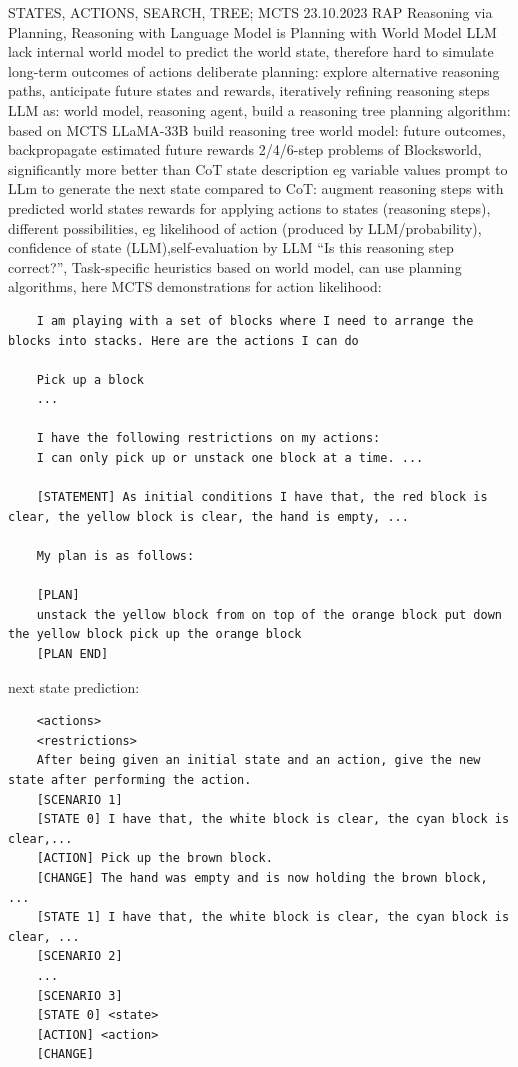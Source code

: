 \documentclass{article}
\begin{document}
STATES, ACTIONS, SEARCH, TREE; MCTS
\cite{hao_reasoning_2023} 23.10.2023 RAP Reasoning via Planning, Reasoning with Language Model is Planning with World Model
LLM lack internal world model to predict the world state, therefore hard to simulate long-term outcomes of actions
deliberate planning: explore alternative reasoning paths, anticipate future states and rewards, iteratively refining reasoning steps
LLM as: world model, reasoning agent, build a reasoning tree
planning algorithm: based on MCTS
LLaMA-33B
build reasoning tree
world model: future outcomes, 
backpropagate estimated future rewards
2/4/6-step problems of Blocksworld, significantly more better than CoT
state description eg variable values
prompt to LLm to generate the next state
compared to CoT: augment reasoning steps with predicted world states
rewards for applying actions to states (reasoning steps), different possibilities, eg likelihood of action (produced by LLM/probability), confidence of state (LLM),self-evaluation by LLM “Is this reasoning step correct?”, Task-specific heuristics
based on world model, can use planning algorithms, here MCTS
demonstrations for action likelihood:
\begin{verbatim}
	I am playing with a set of blocks where I need to arrange the blocks into stacks. Here are the actions I can do 
	
	Pick up a block 
	...
	
	I have the following restrictions on my actions: 
	I can only pick up or unstack one block at a time. ...
	
	[STATEMENT] As initial conditions I have that, the red block is clear, the yellow block is clear, the hand is empty, ...
	
	My plan is as follows: 
	
	[PLAN] 
	unstack the yellow block from on top of the orange block put down the yellow block pick up the orange block
	[PLAN END]
\end{verbatim}
next state prediction: 
\begin{verbatim}
	<actions>
	<restrictions>
	After being given an initial state and an action, give the new state after performing the action. 
	[SCENARIO 1] 
	[STATE 0] I have that, the white block is clear, the cyan block is clear,... 
	[ACTION] Pick up the brown block. 
	[CHANGE] The hand was empty and is now holding the brown block, ... 
	[STATE 1] I have that, the white block is clear, the cyan block is clear, ...
	[SCENARIO 2]
	...
	[SCENARIO 3] 
	[STATE 0] <state> 
	[ACTION] <action> 
	[CHANGE]
\end{verbatim}
\end{document}
